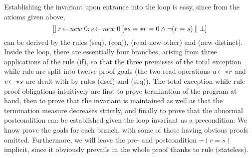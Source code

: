 Establishing the invariant upon entrance into the loop is easy, since
from the axioms given above, 
\begin{equation}\label{eq:init-seq}
[]\:r \!\gets\! \mathit{new}\ 0; s \!\gets\! \mathit{new}\ 0\:[{\ast s} = {\ast r} = 0 \land \lnot (r = s)\:\|\:\bot]
\end{equation}
can be derived by the rules (seq), (conj), (read-new-other) and (new-distinct).
Inside the loop, there are essentially four branches, arising from three
applications of the rule (if), so that the three premisses of the total
exception while rule are split into twelve proof goals (the two read operations
$u\!\gets\! {\ast r}$ and $v\!\gets\! {\ast s}$ are dealt with by rules (dsef) and (seq)).
The total exception while rule proof obligations intuitively are first to prove
termination of the program at hand, then to prove that the invariant is
maintained as well as that the termination measure decreases strictly, and
finally to prove that the abnormal postcondition can be established given the
loop invariant as a precondition. We know prove the goals for each branch, with
some of those having obvious proofs omitted. Furthermore, we will leave the pre-
and postcondition $\lnot (r = s)$ implicit, since it obviously prevails in the whole
proof thanks to rule (stateless).

